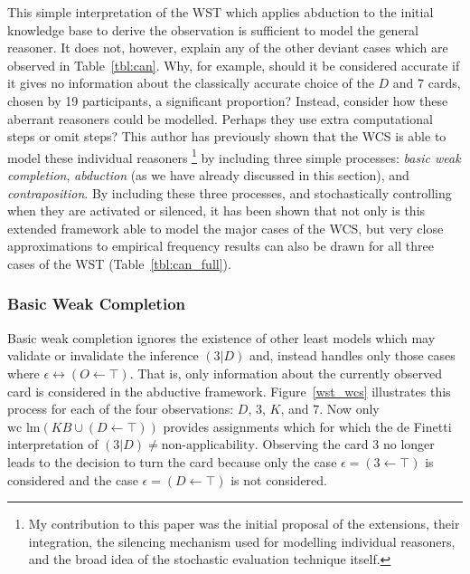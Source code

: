 This simple interpretation of the WST which applies abduction to the initial knowledge base to derive the observation is sufficient to model the general reasoner. It does not, however, explain any of the other deviant cases which are observed in Table~\ref{tbl:can}. Why, for example, should it be considered accurate if it gives no information about the classically accurate choice of the $D$ and $7$ cards, chosen by 19 participants, a significant proportion? Instead, consider how these aberrant reasoners could be modelled. Perhaps they use extra computational steps or omit steps? This author has previously shown that the WCS is able to model these individual reasoners \citep{breu2019weak}\footnote{My contribution to this paper was the initial proposal of the extensions, their integration, the silencing mechanism used for modelling individual reasoners, and the broad idea of the stochastic evaluation technique itself.} by including three simple processes: \textit{basic weak completion}, \textit{abduction} (as we have already discussed in this section), and \textit{contraposition}. By including these three processes, and stochastically controlling when they are activated or silenced, it has been shown that not only is this extended framework able to model the major cases of the WCS, but very close approximations to empirical frequency results can also be drawn for all three cases of the WST (Table~\ref{tbl:can_full}).

\subsubsection*{Basic Weak Completion}

Basic weak completion ignores the existence of other least models which may validate or invalidate the inference $(3|D)$ and, instead handles only those cases where $\epsilon \leftrightarrow (O\leftarrow \top)$. That is, only information about the currently observed card is considered in the abductive framework. Figure~\ref{wst_wcs} illustrates this process for each of the four observations: $D$, $3$, $K$, and $7$. Now only $\textrm{wc lm}(KB \cup (D \leftarrow \top))$ provides assignments which for which the de Finetti interpretation of $(3|D)\neq \textrm{non-applicability}$. Observing the card $3$ no longer leads to the decision to turn the card because only the case $\epsilon = (3\leftarrow \top)$ is considered and the case $\epsilon = (D \leftarrow \top)$ is not considered.

